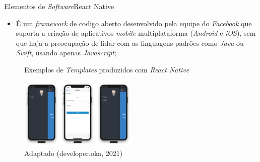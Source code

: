 \begin{frame}{Elementos de \textit{Software}}{React Native}
    \begin{itemize}
        \item É um \textit{framework} de codigo aberto desenvolvido pela equipe do \textit{Facebook} que suporta a criação de aplicativos \textit{mobile} multiplataforma (\textit{Android} e \textit{iOS}), sem que haja a preocupação de lidar com as linguagens padrões como \textit{Java} ou \textit{Swift}, usando apenas \textit{Javascript};
    \end{itemize}

    \begin{figure}[H]
        \centering
        \caption{Exemplos de \textit{Templates} produzidos com \textit{React Native}}
        \includegraphics[width=0.5\textwidth]{figuras/react_native_elements.png}
        \caption*{\tiny{Adaptado (developer.oka, 2021)}}
        \label{fig:react-native}
    \end{figure} 

\end{frame}